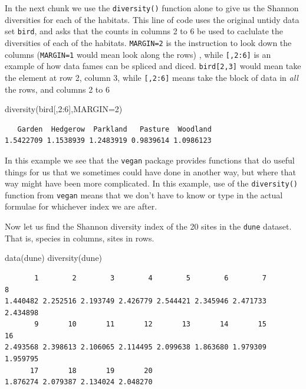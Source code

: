 \documentclass[
  letterpaper,
  DIV=11,
  numbers=noendperiod]{scrreprt}
\newenvironment{Shaded}{\begin{snugshade}}{\end{snugshade}}
\newcommand{\AttributeTok}[1]{\textcolor[rgb]{0.40,0.45,0.13}{#1}}
\newcommand{\DecValTok}[1]{\textcolor[rgb]{0.68,0.00,0.00}{#1}}
\newcommand{\FunctionTok}[1]{\textcolor[rgb]{0.28,0.35,0.67}{#1}}
\newcommand{\NormalTok}[1]{\textcolor[rgb]{0.00,0.23,0.31}{#1}}
\newcommand{\SpecialCharTok}[1]{\textcolor[rgb]{0.37,0.37,0.37}{#1}}
\begin{document}
In the next chunk we use the \texttt{diversity()} function alone to give
us the Shannon diversities for each of the habitats. This line of code
uses the original untidy data set \texttt{bird}, and asks that the
counts in columns 2 to 6 be used to caclulate the diversities of each of
the habitats. \texttt{MARGIN=2} is the instruction to look down the
columns (\texttt{MARGIN=1} would mean look along the rows) , while
\texttt{{[},2:6{]}} is an example of how data fames can be spliced and
diced. \texttt{bird{[}2,3{]}} would mean take the element at row 2,
column 3, while \texttt{{[},2:6{]}} means take the block of data in
\emph{all} the rows, and columns 2 to 6

\begin{Shaded}
\begin{Highlighting}[]
\FunctionTok{diversity}\NormalTok{(bird[,}\DecValTok{2}\SpecialCharTok{:}\DecValTok{6}\NormalTok{],}\AttributeTok{MARGIN=}\DecValTok{2}\NormalTok{)}
\end{Highlighting}
\end{Shaded}

\begin{verbatim}
   Garden  Hedgerow  Parkland   Pasture  Woodland 
1.5422709 1.1538939 1.2483919 0.9839614 1.0986123 
\end{verbatim}

In this example we see that the \texttt{vegan} package provides
functions that do useful things for us that we sometimes could have done
in another way, but where that way might have been more complicated. In
this example, use of the \texttt{diversity()} function from
\texttt{vegan} means that we don't have to know or type in the actual
formulae for whichever index we are after.

Now let us find the Shannon diversity index of the 20 sites in the
\texttt{dune} dataset. That is, species in columns, sites in rows.

\begin{Shaded}
\begin{Highlighting}[]
\FunctionTok{data}\NormalTok{(dune)}
\FunctionTok{diversity}\NormalTok{(dune)}
\end{Highlighting}
\end{Shaded}

\begin{verbatim}
       1        2        3        4        5        6        7        8 
1.440482 2.252516 2.193749 2.426779 2.544421 2.345946 2.471733 2.434898 
       9       10       11       12       13       14       15       16 
2.493568 2.398613 2.106065 2.114495 2.099638 1.863680 1.979309 1.959795 
      17       18       19       20 
1.876274 2.079387 2.134024 2.048270 
\end{verbatim}
\end{document}
